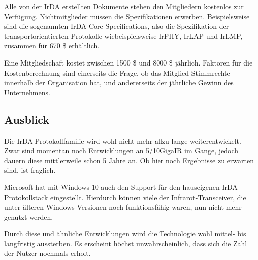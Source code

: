 \begin{multicols}{3}
Alle von der IrDA erstellten Dokumente stehen den Mitgliedern kostenlos zur Verfügung. Nichtmitglieder müssen die Spezifikationen erwerben. Beispielsweise sind die sogenannten IrDA Core Specifications, also die Spezifikation der transportorientierten Protokolle wiebeispielsweise IrPHY, IrLAP und IrLMP, zusammen für 670 \$ erhältlich.

Eine Mitgliedschaft kostet zwischen 1500 \$ und 8000 \$ jährlich. Faktoren für die Kostenberechnung sind einerseits die Frage, ob das Mitglied Stimmrechte innerhalb der Organisation hat, und andererseits der jährliche Gewinn des Unternehmens.

\subsection*{Ausblick}
Die IrDA-Protokollfamilie wird wohl nicht mehr allzu lange weiterentwickelt. Zwar sind momentan noch Entwicklungen an 5/10GigaIR im Gange, jedoch dauern diese mittlerweile schon 5 Jahre an. Ob hier noch Ergebnisse zu erwarten sind, ist fraglich.

Microsoft hat mit Windows 10 auch den Support für den hauseigenen IrDA-Protokollstack eingestellt. Hierdurch können viele der Infrarot-Transceiver, die unter älteren Windows-Versionen noch funktionsfähig waren, nun nicht mehr genutzt werden. 

Durch diese und ähnliche Entwicklungen wird die Technologie wohl mittel- bis langfristig aussterben. Es erscheint höchst unwahrscheinlich, dass sich die Zahl der Nutzer nochmals erholt.

\printbibliography[segment=11,heading=subbibliography]
\end{multicols}

\newpage
